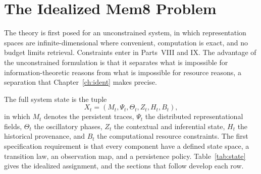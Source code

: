 \chapter{The Idealized Mem8 Problem}\label{ch:problem}

The theory is first posed for an unconstrained system, in which representation spaces are infinite-dimensional where convenient, computation is exact, and no budget limits retrieval. Constraints enter in Parts~VIII and IX. The advantage of the unconstrained formulation is that it separates what is impossible for information-theoretic reasons from what is impossible for resource reasons, a separation that Chapter~\ref{ch:ident} makes precise.

The full system state is the tuple
\begin{equation}\label{eq:state}
X_t=(M_t,\Psi_t,\Theta_t,Z_t,H_t,B_t),
\end{equation}
in which $M_t$ denotes the persistent traces, $\Psi_t$ the distributed representational fields, $\Theta_t$ the oscillatory phases, $Z_t$ the contextual and inferential state, $H_t$ the historical provenance, and $B_t$ the computational resource constraints. The first specification requirement is that every component have a defined state space, a transition law, an observation map, and a persistence policy. Table~\ref{tab:state} gives the idealized assignment, and the sections that follow develop each row.

